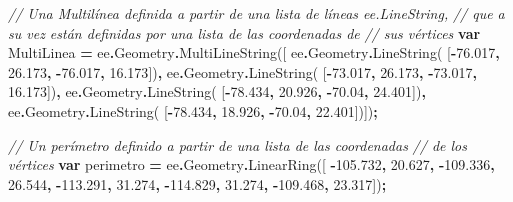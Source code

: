 \documentclass[
  12pt,
  letterpaper,
  twoside]{book}
\newenvironment{Shaded}{\begin{snugshade}}{\end{snugshade}}
\newcommand{\AttributeTok}[1]{\textcolor[rgb]{0.77,0.63,0.00}{#1}}
\newcommand{\CommentTok}[1]{\textcolor[rgb]{0.56,0.35,0.01}{\textit{#1}}}
\newcommand{\FloatTok}[1]{\textcolor[rgb]{0.00,0.00,0.81}{#1}}
\newcommand{\FunctionTok}[1]{\textcolor[rgb]{0.00,0.00,0.00}{#1}}
\newcommand{\KeywordTok}[1]{\textcolor[rgb]{0.13,0.29,0.53}{\textbf{#1}}}
\newcommand{\NormalTok}[1]{#1}
\newcommand{\OperatorTok}[1]{\textcolor[rgb]{0.81,0.36,0.00}{\textbf{#1}}}
\begin{document}
\begin{Shaded}
\begin{Highlighting}[]
\CommentTok{// Una Multilínea definida a partir de una lista de líneas ee.LineString, }
\CommentTok{// que a su vez están definidas por una lista de las coordenadas de}
\CommentTok{// sus vértices}
\KeywordTok{var}\NormalTok{ MultiLinea }\OperatorTok{=}\NormalTok{ ee}\OperatorTok{.}\AttributeTok{Geometry}\OperatorTok{.}\FunctionTok{MultiLineString}\NormalTok{([ }
\NormalTok{   ee}\OperatorTok{.}\AttributeTok{Geometry}\OperatorTok{.}\FunctionTok{LineString}\NormalTok{(                     }
\NormalTok{     [}\OperatorTok{{-}}\FloatTok{76.017}\OperatorTok{,} \FloatTok{26.173}\OperatorTok{,} \OperatorTok{{-}}\FloatTok{76.017}\OperatorTok{,} \FloatTok{16.173}\NormalTok{])}\OperatorTok{,}      
\NormalTok{  ee}\OperatorTok{.}\AttributeTok{Geometry}\OperatorTok{.}\FunctionTok{LineString}\NormalTok{(                      }
\NormalTok{    [}\OperatorTok{{-}}\FloatTok{73.017}\OperatorTok{,} \FloatTok{26.173}\OperatorTok{,} \OperatorTok{{-}}\FloatTok{73.017}\OperatorTok{,} \FloatTok{16.173}\NormalTok{])}\OperatorTok{,}       
\NormalTok{  ee}\OperatorTok{.}\AttributeTok{Geometry}\OperatorTok{.}\FunctionTok{LineString}\NormalTok{(                      }
\NormalTok{    [}\OperatorTok{{-}}\FloatTok{78.434}\OperatorTok{,} \FloatTok{20.926}\OperatorTok{,} \OperatorTok{{-}}\FloatTok{70.04}\OperatorTok{,} \FloatTok{24.401}\NormalTok{])}\OperatorTok{,}
\NormalTok{  ee}\OperatorTok{.}\AttributeTok{Geometry}\OperatorTok{.}\FunctionTok{LineString}\NormalTok{(}
\NormalTok{    [}\OperatorTok{{-}}\FloatTok{78.434}\OperatorTok{,} \FloatTok{18.926}\OperatorTok{,} \OperatorTok{{-}}\FloatTok{70.04}\OperatorTok{,} \FloatTok{22.401}\NormalTok{])])}\OperatorTok{;}

\CommentTok{// Un perímetro definido a partir de una lista  de las coordenadas }
\CommentTok{// de los vértices}
\KeywordTok{var}\NormalTok{ perimetro }\OperatorTok{=}\NormalTok{ ee}\OperatorTok{.}\AttributeTok{Geometry}\OperatorTok{.}\FunctionTok{LinearRing}\NormalTok{([ }
  \OperatorTok{{-}}\FloatTok{105.732}\OperatorTok{,} \FloatTok{20.627}\OperatorTok{,}                      
  \OperatorTok{{-}}\FloatTok{109.336}\OperatorTok{,} \FloatTok{26.544}\OperatorTok{,}                      
  \OperatorTok{{-}}\FloatTok{113.291}\OperatorTok{,} \FloatTok{31.274}\OperatorTok{,}
  \OperatorTok{{-}}\FloatTok{114.829}\OperatorTok{,} \FloatTok{31.274}\OperatorTok{,}
  \OperatorTok{{-}}\FloatTok{109.468}\OperatorTok{,} \FloatTok{23.317}\NormalTok{])}\OperatorTok{;}
\end{Highlighting}
\end{Shaded}
\end{document}
